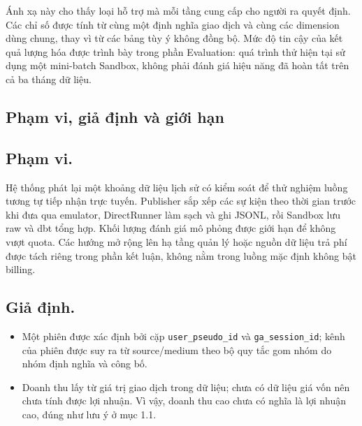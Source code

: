 Ánh xạ này cho thấy loại hỗ trợ mà mỗi tầng cung cấp cho người ra quyết định. Các chỉ số được tính từ cùng một định nghĩa giao dịch và cùng các dimension dùng chung, thay vì từ các bảng tùy ý không đồng bộ. Mức độ tin cậy của kết quả lượng hóa được trình bày trong phần Evaluation: quá trình thử hiện tại sử dụng một mini-batch Sandbox, không phải đánh giá hiệu năng đã hoàn tất trên cả ba tháng dữ liệu.

\newpage
\subsection{Phạm vi, giả định và giới hạn}

\subsection*{Phạm vi.}
Hệ thống phát lại một khoảng dữ liệu lịch sử có kiểm soát để thử nghiệm luồng tương tự tiếp nhận trực tuyến. Publisher sắp xếp các sự kiện theo thời gian trước khi đưa qua emulator, DirectRunner làm sạch và ghi JSONL, rồi Sandbox lưu raw và dbt tổng hợp. Khối lượng đánh giá mô phỏng được giới hạn để không vượt quota. Các hướng mở rộng lên hạ tầng quản lý hoặc nguồn dữ liệu trả phí được tách riêng trong phần kết luận, không nằm trong luồng mặc định không bật billing.\\

\subsection*{Giả định.}
\begin{itemize}
    \item Một phiên được xác định bởi cặp \texttt{user\_pseudo\_id} và \texttt{ga\_session\_id}; kênh của phiên được suy ra từ source/medium theo bộ quy tắc gom nhóm do nhóm định nghĩa và công bố.

    \item Doanh thu lấy từ giá trị giao dịch trong dữ liệu; chưa có dữ liệu giá vốn nên chưa tính được lợi nhuận. Vì vậy, doanh thu cao chưa có nghĩa là lợi nhuận cao, đúng như lưu ý ở mục 1.1.
\end{itemize}

